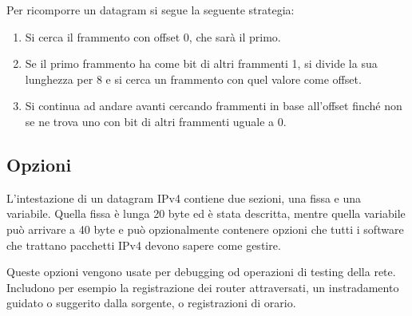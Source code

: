         Per ricomporre un datagram si segue la seguente strategia:
        \begin{enumerate}
            \item Si cerca il frammento con offset 0, che sarà il primo.
            
            \item Se il primo frammento ha come bit di altri frammenti 1, si divide la sua lunghezza per 8 e si cerca un frammento con quel valore come offset.
            
            \item Si continua ad andare avanti cercando frammenti in base all'offset finché non se ne trova uno con bit di altri frammenti uguale a 0.
        \end{enumerate}
        
    \subsection{Opzioni}
        L'intestazione di un datagram IPv4 contiene due sezioni, una fissa e una variabile. Quella fissa è lunga 20 byte ed è stata descritta, mentre quella variabile può arrivare a 40 byte e può opzionalmente contenere opzioni che tutti i software che trattano pacchetti IPv4 devono sapere come gestire.
        
        Queste opzioni vengono usate per debugging od operazioni di testing della rete. Includono per esempio la registrazione dei router attraversati, un instradamento guidato o suggerito dalla sorgente, o registrazioni di orario.